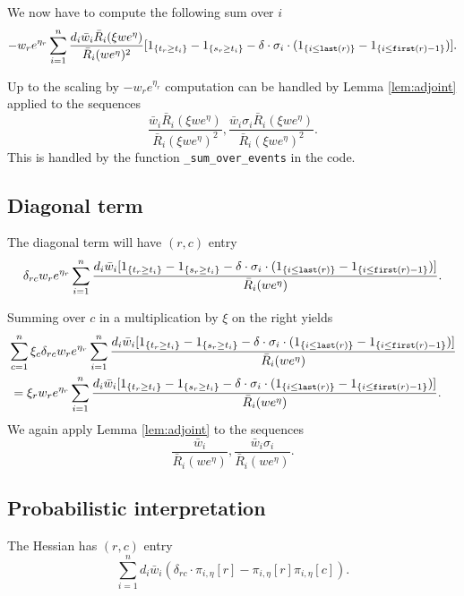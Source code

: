 \documentclass{article}
\begin{document}
 We now
 have to compute the following sum over $i$ 
 $$
-  w_r e^{\eta_r} \sum_{i=1}^n \frac{d_i \bar{w}_i \bar{R}_i(\xi w e^{\eta})}{\bar{R}_i(w e^{\eta})^2} [1_{\{t_r \geq t_i\}} - 1_{\{s_r \geq t_i\}} - \delta \cdot \sigma_i \cdot (1_{\{i \leq {\tt last}(r)\}} - 1_{\{i \leq {\tt first}(r)-1\}})] .
 $$

Up to the scaling by $-w_r e^{\eta_r}$ computation can be handled by Lemma \ref{lem:adjoint}
applied to the sequences
$$
\frac{\bar{w}_i \bar{R}_i(\xi w e^{\eta})}{\bar{R}_i(\xi w e^{\eta})^2}, \frac{\bar{w}_i \sigma_i \bar{R}_i(\xi w e^{\eta})}{\bar{R}_i(\xi w e^{\eta})^2}.
$$
This is handled by the function {\tt \_sum\_over\_events} in the code.

\subsection{Diagonal term}

The diagonal term will have $(r,c)$ entry
$$
\delta_{rc} w_r e^{\eta_r} \sum_{i=1}^n \frac{d_i \bar{w}_i [1_{\{t_r \geq t_i\}} - 1_{\{s_r \geq t_i\}} - \delta \cdot \sigma_i \cdot (1_{\{i \leq {\tt last}(r)\}} - 1_{\{i \leq {\tt first}(r)-1\}})]}{\bar{R}_i(we^{\eta})}.
$$

Summing over $c$ in a multiplication by $\xi$ on the right yields
$$
\begin{aligned}
\lefteqn{
\sum_{c=1}^n \xi_c \delta_{rc} w_r e^{\eta_r} \sum_{i=1}^n \frac{d_i \bar{w}_i [1_{\{t_r \geq t_i\}} - 1_{\{s_r \geq t_i\}} - \delta \cdot \sigma_i \cdot (1_{\{i \leq {\tt last}(r)\}} - 1_{\{i \leq {\tt first}(r)-1\}})]}{\bar{R}_i(we^{\eta})}} \\
&= \xi_r w_r e^{\eta_r} \sum_{i=1}^n \frac{d_i \bar{w}_i [1_{\{t_r \geq t_i\}} - 1_{\{s_r \geq t_i\}} - \delta \cdot \sigma_i \cdot (1_{\{i \leq {\tt last}(r)\}} - 1_{\{i \leq {\tt first}(r)-1\}})]}{\bar{R}_i(we^{\eta})}. 
\end{aligned}
$$
We again apply Lemma \ref{lem:adjoint} to the sequences
$$
\frac{\bar{w}_i}{\bar{R}_i(we^{\eta})}, \frac{\bar{w}_i \sigma_i}{\bar{R}_i(we^{\eta})}.$$

\subsection{Probabilistic interpretation}

The Hessian has $(r,c)$ entry
$$
\sum_{i=1}^n d_i \bar{w}_i \left( \delta_{rc} \cdot \pi_{i,\eta}[r] -
\pi_{i,\eta}[r]\pi_{i,\eta}[c] \right).$$
\end{document}
